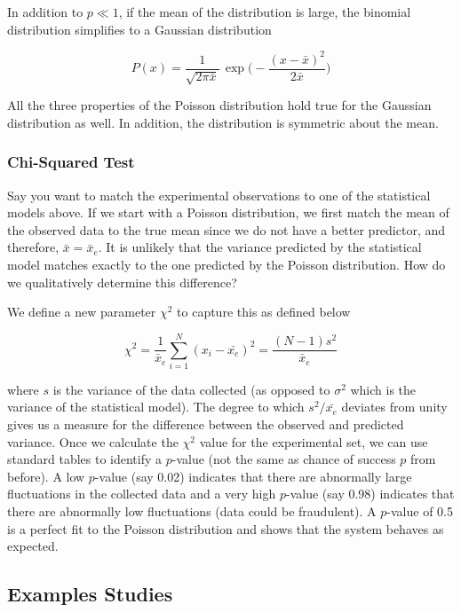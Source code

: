 \documentclass{article}
\begin{document}
In addition to $p \ll 1$, if the mean of the distribution is large, the binomial distribution simplifies to a Gaussian distribution

\begin{equation}\label{eqn:gaussian_distri}
    P(x) = \frac{1}{\sqrt{2 \pi \bar{x}}} \, \exp \bigg(- \frac{(x-\bar{x})^2}{2\bar{x}}\bigg)
\end{equation}

All the three properties of the Poisson distribution hold true for the Gaussian distribution as well. In addition, the distribution is 
symmetric about the mean.


\subsubsection{Chi-Squared Test}

Say you want to match the experimental observations to one of the statistical models above. If we start with a Poisson distribution, we first match the mean of the observed data to the 
true mean since we do not have a better predictor, and therefore, $\bar{x} = \bar{x}_e$. It is unlikely that the variance predicted by the statistical model matches exactly to the one predicted by 
the Poisson distribution. How do we qualitatively determine this difference?


We define a new parameter $\chi^2$ to capture this as defined below

\begin{equation}\label{eqn:chi_squared}
    \chi^2 = \frac{1}{\bar{x}_e} \sum_{i=1}^{N} (x_i-\bar{x_e})^2 = \frac{(N-1)s^2}{\bar{x}_e}
\end{equation}

where $s$ is the variance of the data collected (as opposed to $\sigma ^2$ which is the variance of the statistical model).
The degree to which $s^2/\bar{x_e}$ deviates from unity gives us a measure for the difference between the observed and predicted variance. 
Once we calculate the $\chi^2$ value for the experimental set, we can use standard tables to identify a $p$-value (not the same as chance of success $p$ from before).
A low $p$-value (say 0.02) indicates that there are abnormally large fluctuations in the collected data and a very high $p$-value (say 0.98) indicates that there are abnormally 
low fluctuations (data could be fraudulent). A $p$-value of 0.5 is a perfect fit to the Poisson distribution and shows that the system behaves as expected. 

\subsection{Examples Studies}
\end{document}
